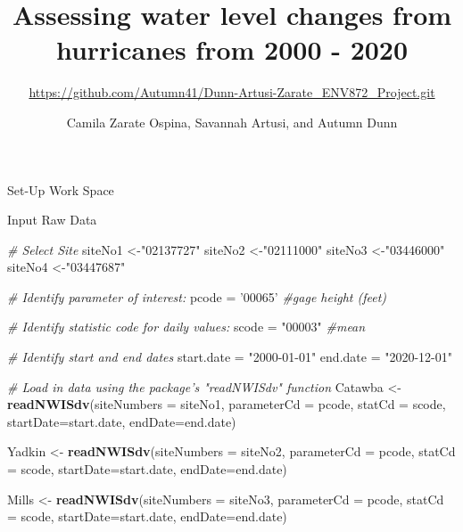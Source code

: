 \documentclass[12pt,]{article}
\title{Assessing water level changes from hurricanes from 2000 - 2020}
\subtitle{\url{https://github.com/Autumn41/Dunn-Artusi-Zarate_ENV872_Project.git}}
\author{Camila Zarate Ospina, Savannah Artusi, and Autumn Dunn}
\date{}
\newenvironment{Shaded}{\begin{snugshade}}{\end{snugshade}}
\newcommand{\CommentTok}[1]{\textcolor[rgb]{0.56,0.35,0.01}{\textit{#1}}}
\newcommand{\DataTypeTok}[1]{\textcolor[rgb]{0.13,0.29,0.53}{#1}}
\newcommand{\KeywordTok}[1]{\textcolor[rgb]{0.13,0.29,0.53}{\textbf{#1}}}
\newcommand{\NormalTok}[1]{#1}
\newcommand{\StringTok}[1]{\textcolor[rgb]{0.31,0.60,0.02}{#1}}
\begin{document}
\maketitle

\newpage
\tableofcontents 
\newpage
\listoftables 
\newpage
\listoffigures 
\newpage

Set-Up Work Space

Input Raw Data

\begin{Shaded}
\begin{Highlighting}[]
\CommentTok{# Select Site}
\NormalTok{siteNo1 <-}\StringTok{"02137727"}
\NormalTok{siteNo2 <-}\StringTok{"02111000"}
\NormalTok{siteNo3 <-}\StringTok{"03446000"}
\NormalTok{siteNo4 <-}\StringTok{"03447687"}

\CommentTok{# Identify parameter of interest: }
\NormalTok{pcode =}\StringTok{ '00065'} \CommentTok{#gage height (feet)}

\CommentTok{# Identify statistic code for daily values: }
\NormalTok{scode =}\StringTok{ "00003"}  \CommentTok{#mean}

\CommentTok{# Identify start and end dates}
\NormalTok{start.date =}\StringTok{ "2000-01-01"}
\NormalTok{end.date =}\StringTok{ "2020-12-01"}

\CommentTok{# Load in data using the package's "readNWISdv" function}
\NormalTok{Catawba <-}\StringTok{ }\KeywordTok{readNWISdv}\NormalTok{(}\DataTypeTok{siteNumbers =}\NormalTok{ siteNo1, }
                    \DataTypeTok{parameterCd =}\NormalTok{ pcode, }
                    \DataTypeTok{statCd =}\NormalTok{ scode, }
                    \DataTypeTok{startDate=}\NormalTok{start.date, }
                    \DataTypeTok{endDate=}\NormalTok{end.date)}

\NormalTok{Yadkin <-}\StringTok{ }\KeywordTok{readNWISdv}\NormalTok{(}\DataTypeTok{siteNumbers =}\NormalTok{ siteNo2, }
                    \DataTypeTok{parameterCd =}\NormalTok{ pcode, }
                    \DataTypeTok{statCd =}\NormalTok{ scode, }
                    \DataTypeTok{startDate=}\NormalTok{start.date, }
                    \DataTypeTok{endDate=}\NormalTok{end.date)}

\NormalTok{Mills <-}\StringTok{ }\KeywordTok{readNWISdv}\NormalTok{(}\DataTypeTok{siteNumbers =}\NormalTok{ siteNo3, }
                    \DataTypeTok{parameterCd =}\NormalTok{ pcode, }
                    \DataTypeTok{statCd =}\NormalTok{ scode, }
                    \DataTypeTok{startDate=}\NormalTok{start.date, }
                    \DataTypeTok{endDate=}\NormalTok{end.date)}


\end{Highlighting}
\end{Shaded}
\end{document}
